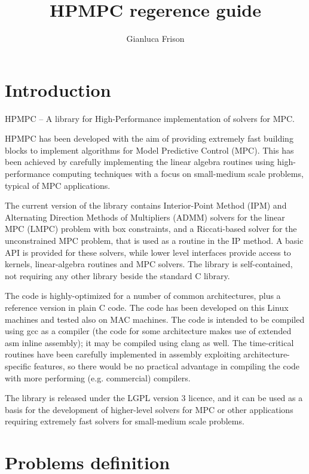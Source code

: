 \documentclass[a4paper]{report}
\title{HPMPC regerence guide}
\author{Gianluca Frison}
\begin{document}
\maketitle
\tableofcontents

\chapter{Introduction}

HPMPC -- A library for High-Performance implementation of solvers for MPC.

HPMPC has been developed with the aim of providing extremely fast building blocks to implement algorithms for Model Predictive Control (MPC). 
This has been achieved by carefully implementing the linear algebra routines using high-performance computing techniques with a focus on small-medium scale problems, typical of MPC applications.

The current version of the library contains Interior-Point Method (IPM) and Alternating Direction Methods of Multipliers (ADMM) solvers for the linear MPC (LMPC) problem with box constraints, and a Riccati-based solver for the unconstrained MPC problem, that is used as a routine in the IP method.
A basic API is provided for these solvers, while lower level interfaces provide access to kernels, linear-algebra routines and MPC solvers.
The library is self-contained, not requiring any other library beside the standard C library.

The code is highly-optimized for a number of common architectures, plus a reference version in plain C code.
The code has been developed on this Linux machines and tested also on MAC machines. 
The code is intended to be compiled using gcc as a compiler (the code for some architecture makes use of extended asm inline assembly); it may be compiled using clang as well.
The time-critical routines have been carefully implemented in assembly exploiting architecture-specific features, so there would be no practical advantage in compiling the code with more performing (e.g. commercial) compilers.

The library is released under the LGPL version 3 licence, and it can be used as a basis for the development of higher-level solvers for MPC or other applications requiring extremely fast solvers for small-medium scale problems.



\chapter{Problems definition}
\end{document}

